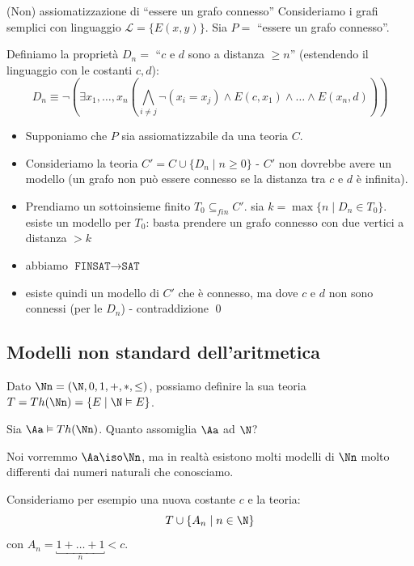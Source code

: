 \documentclass[a4paper,11pt]{report}
\newcommand{\SAT}{\texttt{SAT}}
\newcommand{\FINSAT}{\texttt{FINSAT}}
\begin{document}
\begin{gframe}{(Non) assiomatizzazione di ``essere un grafo connesso''}
    Consideriamo i grafi semplici con linguaggio \( \mathcal{L} = \{E(x,y)\} \).
    Sia \( P = \) ``essere un grafo connesso''.

    Definiamo la proprietà \( D_n = \) ``\( c \) e \( d \) sono a distanza \( \geq n \)'' (estendendo il linguaggio con le costanti \( c, d \)):
    \[ 
    D_n \equiv \neg \left(\exists x_1, \dots, x_n \left(\bigwedge_{i \neq j}\neg (x_i = x_j) \land E(c, x_1)\land \dots \land E(x_n, d)\right)\right)
    \]
    \begin{itemize}
        \item Supponiamo che \( P \) sia assiomatizzabile da una teoria \( C \).
        \item Consideriamo la teoria \( C' = C \cup \{D_n \mid n \ge 0\} \) - \( C'\) non dovrebbe avere un modello (un grafo non può essere connesso se la distanza tra \( c \) e \( d \) è infinita).
        \item Prendiamo un sottoinsieme finito \( T_0 \subseteq_{fin} C' \).
            \subitem sia \( k = \max \{ n \mid D_n \in T_0 \} \).
    \subitem esiste un modello per \( T_0 \): basta prendere un grafo connesso con due vertici a distanza \( > k \)
\item abbiamo \( \FINSAT \to \SAT \)
\item esiste quindi un modello di \( C' \) che è connesso, ma dove \( c \) e \( d \) non sono connessi (per le \( D_n \)) - contraddizione \qed
    \end{itemize}
\end{gframe}

\subsection{Modelli non standard dell'aritmetica}

Dato \( \Nn = (\N, 0, 1, +, *, \leq ) \), possiamo definire la sua teoria \( T = Th(\Nn) = \{E \mid \N \vDash E\} \).

Sia \( \Aa \vDash Th(\Nn) \). Quanto assomiglia \( \Aa \) ad \( \N \)?

Noi vorremmo \( \Aa \iso \Nn \), ma in realtà esistono molti modelli di \( \Nn \) molto differenti dai numeri naturali che conosciamo.

Consideriamo per esempio una nuova costante \( c \) e la teoria:
\[ T \cup \{A_n \mid n\in \N\} \]
con \( A_n = \underbracket{1 + \dots + 1}_{n} < c \).
\end{document}
